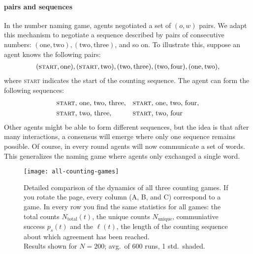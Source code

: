\documentclass{../src/bcthesispart}
\begin{document}
\paragraph{pairs and sequences}
In the number naming game, agents negotiated a set of $(o, w)$ pairs. 
We adapt this mechanism to negotiate a sequence described by pairs of consecutive numbers: $(\text{one}, \text{two}), (\text{two}, \text{three})$, and so on. 
To illustrate this, suppose an agent knows the following pairs:
\begin{align*}
	(\textsc{start}, \text{one}), 
	(\textsc{start}, \text{two}), 
	(\text{two}, \text{three}),
	(\text{two}, \text{four}),
	(\text{one}, \text{two}),
\end{align*}
where \textsc{start} indicates the start of the counting sequence. The agent can form the following sequences:
\begin{align*}
	&\text{\textsc{start}, one, two, three},
	&&\text{\textsc{start}, one, two, four},\\
	&\text{\textsc{start}, two, three},
	&&\text{\textsc{start}, two, four}
\end{align*}
Other agents might be able to form different sequences, but the idea is that after many interactions, a consensus will emerge where only one sequence remains possible.
Of course, in every round agents will now communicate a set of words. 
This generalizes the naming game where agents only exchanged a single word.




\begin{SCfigure}
	\texttt{[image: all-counting-games]}
	\caption{Detailed comparison of the dynamics of all three counting games. 
		If you rotate the page, every column (A, B, and C) correspond to a game. In every row you find the same statistics for all games: the total counts $N_{\text{total}}(t)$, the unique counts $N_{\text{unique}}$, communiative success $p_s(t)$ and the $\ell(t)$, the length of the counting sequence about which agreement has been reached.
		\\[1em]
		Results shown for $N=200$; avg.\ of 600 runs, 1 std.\ shaded.
		\label{fig:all-counting-games}}
\end{SCfigure}
\end{document}

